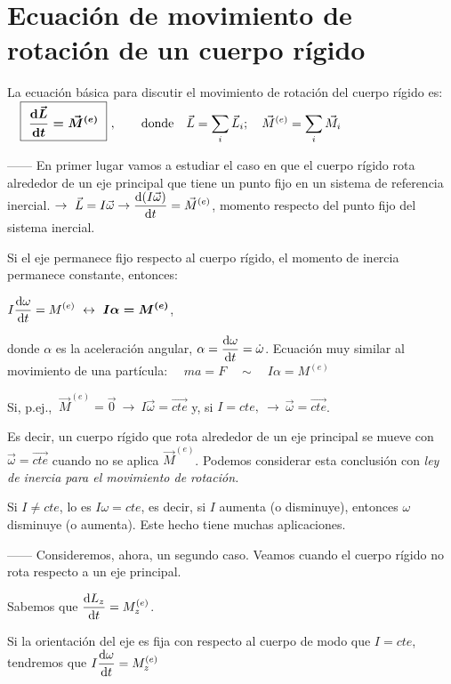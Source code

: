 \section[Ecuación de movimiento de rotación de un cuerpo rígido]{Ecuación de movimiento de rotación de un cuerpo rígido}
La ecuación básica para discutir el movimiento de rotación del cuerpo rígido es:
$\quad \displaystyle \boxed{\ \boldsymbol{ \dv{\vec L}{t}=\vec M^{(e)} }\ } \ , \qquad \text{donde}\quad \vec L=\sum_i \vec L_i; \quad \vec M^{(e)}=\sum_i \vec M_i$ 

------ En primer lugar vamos a estudiar el caso en que el cuerpo rígido rota alrededor de un eje principal que tiene un punto fijo en un sistema de referencia inercial.
$\to \ \displaystyle \vec L=I\vec \omega \to 	\dv{(I\vec \omega)}{t}=\vec M^{(e)}$, 
momento respecto del punto fijo del sistema inercial.

Si el eje permanece fijo respecto al cuerpo rígido, el momento de inercia permanece constante, entonces:

$\displaystyle I\dv{\omega}{t}=M^{(e)} \ \leftrightarrow \ \boldsymbol{ I\alpha=M^{(e)}}$,

donde $\alpha$ es la aceleración angular, $\alpha=\displaystyle \dv{\omega}{t}=\dot{\omega}$. 
Ecuación muy similar al movimiento de una partícula: $ \quad ma=F \quad \sim \quad  I\alpha=M^{(e)}$

Si, p.ej., $\ \vec M^{(e)}=\vec 0 \ \to \ I\vec \omega=\overrightarrow{cte}$ y, si $I=cte ,\ \to \ \vec \omega =\overrightarrow {cte}$.

Es decir, un cuerpo rígido que rota alrededor de un eje principal se mueve con $\vec \omega=\overrightarrow{cte}$
cuando no se aplica $\vec M^{(e)}$. Podemos considerar esta conclusión con \emph{ley de inercia para el movimiento de rotación.}

Si $I\neq cte$, lo es $I \omega=cte$, es decir, si $I$ aumenta (o disminuye), entonces $\omega$ disminuye (o aumenta). Este hecho tiene muchas aplicaciones.

------ Consideremos, ahora, un segundo caso. Veamos cuando el cuerpo rígido no rota respecto a un eje principal.

Sabemos que $\displaystyle \dv{L_z}{t}=M_z^{(e)}$.

Si la orientación del eje es fija con respecto al cuerpo de modo que $I=cte$, tendremos que $\displaystyle I \dv{\omega}{t}= M_z^{(e)} $


